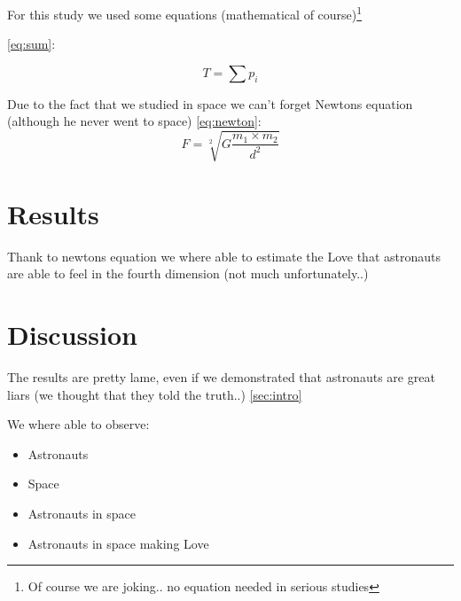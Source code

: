 \documentclass[12pt]{article} %
\begin{document}

For this study we used some equations (mathematical of course)\footnote{Of course we are joking.. no equation needed in serious studies}

\ref{eq:sum}: %

\begin{equation} %
    T = \sum p_i %
\label{eq:sum} %
\end{equation} %

Due to the fact that we studied in space we can't forget Newtons equation (although he never went to space) \ref{eq:newton}:
\begin{equation}
    F = \sqrt[2]{G \frac{m_1\times m_2}{d^2}} 
\label{eq:newton}
\end{equation}

\newpage


\section{Results}
Thank to newtons equation we where able to estimate the Love that astronauts are able to feel in the fourth dimension (not much unfortunately..) 

\section{Discussion}
The results are pretty lame, even if we demonstrated that astronauts are great liars (we thought that they told the truth..) \ref{sec:intro} %

We where able to observe: 
\begin{itemize} %
    \item Astronauts 
    \item Space 
    \item Astronauts in space
    \item Astronauts in space making Love 
\end{itemize} %
\end{document}
